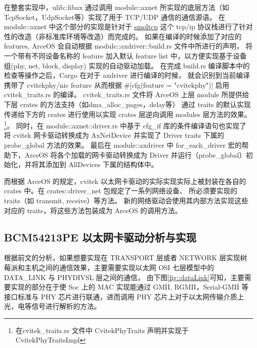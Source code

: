     在整套实现中，ulib::libax 通过调用 module::axnet 所实现的底层方法（如TcpSocket，UdpSocket等）实现了用于 TCP/UDP 通信的通信源语。
    在 module::axnet 中这个部分的实现是针对于 
    \href{https://github.com/smoltcp-rs/smoltcp}{smoltcp} 这个 tcp/ip 协议栈进行了针对性的改造（非标准库环境等改造）而完成的。
    如果在编译的时候添加了对应的 features, ArceOS 会自动根据 module::axdriver::build.rs 文件中所进行的声明，
    将一个带有不同设备名称的 feature 加入默认 feature list 中，以方便实现基于设备组(phy, net, block, display) 实现的自动驱动加载。
    在完成 build.rs 编译脚本中的检查等操作之后，Cargo 在对于 axdriver 进行编译的时候，
    就会识别到当前编译携带了 cvitekphy/nic feature 从而根据 \#[cfg(feature = "cvitekphy")] 启用 cvitek\_traits.rs 的编译。
    cvitek\_traits.rs 文件将 ArceOS 上层 module 所提供给下层 crates 的方法支持（如dma\_alloc\_pages，delay等）
    通过 traits 的默认实现传递给下方的 crates 进行使用以实现 crates 层逆向调用 modules 层方法的效果。
    \footnote{在cvitek\_traits.rs 文件中 CvitekPhyTraits 声明并实现于 CvitekPhyTraitsImpl }。
    同时，在 module::axnet::driver.rs 中基于 cfg\_if 库的条件编译语句也实现了将 cvitek 网卡驱动转换成为 AxNetDevice 
    并实现了 Driver traits 下属的 probe\_global 方法的效果。
    最后在 module::axdriver 中 for\_each\_driver 宏的帮助下，ArceOS 将各个加载的网卡驱动转换成为 
    Driver 并运行（probe\_global）初始化，并将其添加到 AllDevices 下属的结构体中。

    而根据 ArceOS 的规定，cvitek 以太网卡驱动的实际实现实际上被封装在各自的 crates 中。在 crates::driver\_net 包规定了一系列网络设备、
    所必须要实现的 traits（如 transmit, receive）等方法。
    新的网络驱动会使用其内部方法实现这些对应的 traits，将这些方法包装成为 ArceOS 的调用方法。

\subsection{BCM54213PE 以太网卡驱动分析与实现}

    根据前文的分析，如果想要实现在 TRANSPORT 层或者 NETWORK 层实现树莓派和主机之间的通信效果，主要需要实现以太网 OSI 七层模型中的 DATA\_LINK 与 PHYDIVSL 层之间的通信，
    由下图\ref{fig::dataLink}可知，主要需要实现的部分在于使 Soc 上的 MAC 实现能通过 GMII, RGMII，Serial-GMII 等接口标准与 PHY 芯片进行联通，进而调用 PHY 芯片上对于以太网传输介质上光，电等信号进行解析的方法。
        
